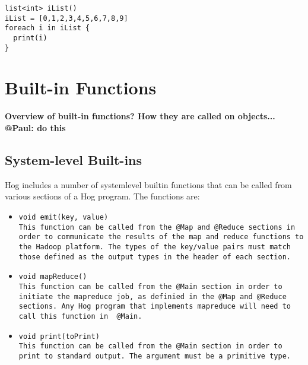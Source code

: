 \documentclass{book}
\begin{document}
\begin{verbatim}
list<int> iList()
iList = [0,1,2,3,4,5,6,7,8,9]
foreach i in iList {
  print(i)
}
\end{verbatim}




\chapter{Built-in Functions} %
\label{cha:built_in_functions}

\textbf{Overview of built-in functions? How they are called on objects...} \textbf{@Paul: do this}

\section{System-level Built-ins} %
\label{sec:system_level_built_ins}

Hog includes a number of system­level built­in functions that can be called from
various sections of a Hog program. The functions are:

\begin{itemize} 

\item[] \tt void emit(key, value) \rm \\

This function can be called from the \tt @Map \rm and \tt @Reduce \rm sections in
order to communicate the results of the map and reduce functions to the Hadoop
platform. The types of the key/value pairs must match those defined as the output
types in the header of each section.

\item[] \tt void mapReduce() \rm \\

This function can be called from the \tt @Main \rm section in order to initiate the
mapreduce job, as definied in the \tt @Map \rm and \tt @Reduce \rm sections. Any
Hog program that implements mapreduce will need to call this function in \tt
@Main\rm.

\item[] \tt void print(toPrint) \rm \\

This function can be called from the \tt @Main \rm section in order to print to
standard output. The argument must be a primitive type.

\end{itemize}
\end{document}
